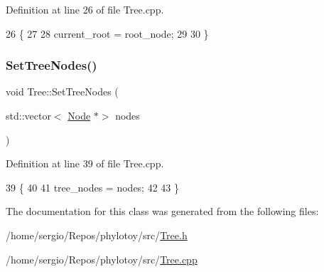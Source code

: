 Definition at line 26 of file Tree.\+cpp.


\begin{DoxyCode}
26                                  \{
27   
28   current\_root = root\_node;
29   
30 \}
\end{DoxyCode}
\mbox{\label{classTree_a429c0d87d451e9b219e4d001923c7134}} 
\subsubsection{\texorpdfstring{Set\+Tree\+Nodes()}{SetTreeNodes()}}
{\footnotesize\ttfamily void Tree\+::\+Set\+Tree\+Nodes (\begin{DoxyParamCaption}\item[{std\+::vector$<$ \hyperlink{classNode}{Node} $\ast$$>$}]{nodes }\end{DoxyParamCaption})}



Definition at line 39 of file Tree.\+cpp.


\begin{DoxyCode}
39                                              \{
40   
41   tree\_nodes = nodes;
42   
43 \}
\end{DoxyCode}


The documentation for this class was generated from the following files\+:\begin{DoxyCompactItemize}
\item 
/home/sergio/\+Repos/phylotoy/src/\hyperlink{Tree_8h}{Tree.\+h}\item 
/home/sergio/\+Repos/phylotoy/src/\hyperlink{Tree_8cpp}{Tree.\+cpp}\end{DoxyCompactItemize}
